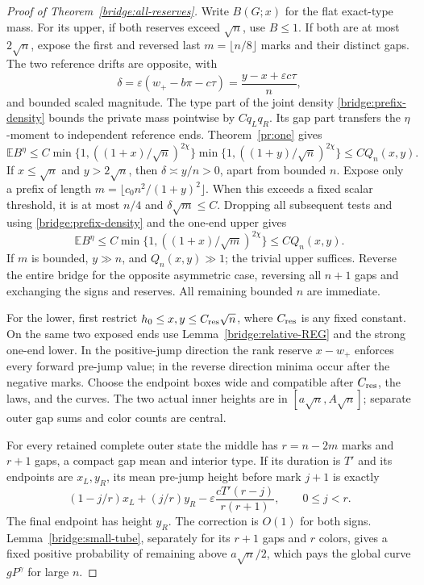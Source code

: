 \begin{proof}[Proof of Theorem~\ref{bridge:all-reserves}]
Write $B(G;x)$ for the flat exact-type mass. For its upper, if both
reserves exceed $\sqrt n$, use $B\le1$. If both are at most
$2\sqrt n$, expose the first and reversed last $m=\lfloor n/8\rfloor$
marks and their distinct gaps. The two reference drifts are opposite,
with
\begin{equation}
 \delta=\varepsilon(w_+-b\pi-c\tau)
           =\frac{y-x+\varepsilon c\tau}{n},
 \label{bridge:rank-drift}
\end{equation}
and bounded scaled magnitude. The type part of the joint density
\eqref{bridge:prefix-density} bounds the private mass pointwise by
$Cq_Lq_R$. Its gap part transfers the $\eta$-moment to independent
reference ends. Theorem~\ref{pr:one} gives
\[
 \mathbb E B^\eta\le C
 \min\{1,((1+x)/\sqrt n)^{2\chi}\}
 \min\{1,((1+y)/\sqrt n)^{2\chi}\}\le C Q_n(x,y).
\]
If $x\le\sqrt n$ and $y>2\sqrt n$, then
$\delta\asymp y/n>0$, apart from bounded $n$. Expose only a prefix
of length $m=\lfloor c_0n^2/(1+y)^2\rfloor$. When this exceeds a
fixed scalar threshold, it is at most $n/4$ and
$\delta\sqrt m\le C$. Dropping all subsequent tests and using
\eqref{bridge:prefix-density} and the one-end upper gives
\[
 \mathbb E B^\eta\le C
      \min\{1,((1+x)/\sqrt m)^{2\chi}\}\le C Q_n(x,y).
\]
If $m$ is bounded, $y\gg n$, and $Q_n(x,y)\gg1$; the trivial
upper suffices. Reverse the entire bridge for the opposite asymmetric
case, reversing all $n+1$ gaps and exchanging the signs and reserves.
All remaining bounded $n$ are immediate.

For the lower, first restrict $h_0\le x,y\le C_{\rm res}\sqrt n$,
where $C_{\rm res}$ is any fixed constant. On the same two exposed
ends use Lemma~\ref{bridge:relative-REG} and the strong one-end
lower. In the positive-jump direction the rank reserve $x-w_+$
enforces every forward pre-jump value; in the reverse direction
minima occur after the negative marks. Choose the endpoint boxes
wide and compatible after $C_{\rm res}$, the laws, and the curves.
The two actual inner heights are in $[a\sqrt n,A\sqrt n]$;
separate outer gap sums and color counts are central.

For every retained complete outer state the middle has
$r=n-2m$ marks and $r+1$ gaps, a compact gap mean and interior type.
If its duration is $T'$ and its endpoints are $x_L,y_R$, its mean
pre-jump height before mark $j+1$ is exactly
\begin{equation}
 (1-j/r)x_L+(j/r)y_R
      -\varepsilon\frac{cT'(r-j)}{r(r+1)},\qquad 0\le j<r.
 \label{bridge:middle-chord}
\end{equation}
The final endpoint has height $y_R$. The correction is $O(1)$ for both
signs. Lemma~\ref{bridge:small-tube}, separately
for its $r+1$ gaps and $r$ colors, gives a fixed positive probability
of remaining above $a\sqrt n/2$, which pays the global curve
$gP^\gamma$ for large $n$.


\end{proof}
